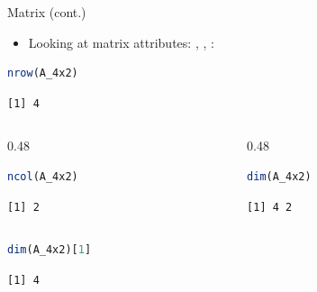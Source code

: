 \begin{frame}[fragile]{Matrix (cont.)}
\begin{itemize}
  \item Looking at matrix attributes: , , :
\end{itemize}
\begin{lstlisting}[language=R]
nrow(A_4x2)
\end{lstlisting}
\begin{lstlisting}[style=output]
[1] 4
\end{lstlisting}
\begin{columns}[T]
\begin{column}{0.48\textwidth}
\begin{lstlisting}[language=R]
ncol(A_4x2)
\end{lstlisting}
\begin{lstlisting}[style=output]
[1] 2
\end{lstlisting}
\end{column}
\begin{column}{0.48\textwidth}
\begin{lstlisting}[language=R]
dim(A_4x2)
\end{lstlisting}
\begin{lstlisting}[style=output]
[1] 4 2
\end{lstlisting}
\end{column}
\end{columns}
\begin{lstlisting}[language=R]
dim(A_4x2)[1]
\end{lstlisting}
\begin{lstlisting}[style=output]
[1] 4
\end{lstlisting}
\end{frame}

